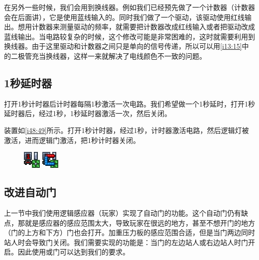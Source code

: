 在另外一些时候，我们会用到换线器。例如我们已经预先做了一个计数器（计数器会在后面讲），它是使用蓝线输入的。同时我们做了一个驱动，该驱动使用红线输出。想用计数器来测量驱动的频率，就需要把计数器改成红线输入或者把驱动改成蓝线输出。当电路较复杂的时候，这个修改可能是非常困难的，这时就需要利用到换线器。由于这里驱动和计数器之间只是单向的信号传递，所以可以用\autoref{i13:15}中的二极管充当换线器，这样一来就解决了电线颜色不一致的问题。

\subsection{1秒延时器}

打开1秒计时器后计时器每隔1秒激活一次电路。我们希望做一个1秒延时，打开1秒延时器后，经过1秒，1秒延时器激活一次，然后关闭。

装置如\autoref{i48:49}所示。打开1秒计时器，经过1秒，计时器激活电路，然后逻辑灯被激活，进而逻辑门激活，把1秒计时器关闭。

\begin{figure}[!h]
\begin{center}
\includegraphics{images/48.png}
\qquad
\includegraphics{images/49.png}
\end{center}
\caption{}
\label{i48:49}
\end{figure}


\subsection{改进自动门}

上一节中我们使用逻辑感应器（玩家）实现了自动门的功能。这个自动门仍有缺点，那就是感应器的感应范围太大，导致玩家在很远的地方，甚至不想开门的地方（门的上方和下方）门也会打开。加重压力板的感应范围合适，但是当门两边同时站人时会导致门关闭。我们需要实现的功能是：当门的左边站人或右边站人时门开启。因此使用或门可以达到我们的要求。

